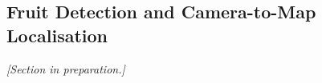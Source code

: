 \subsection{Fruit Detection and Camera-to-Map Localisation}
\label{sec:phaseB_vision}

\emph{[Section in preparation.]}
